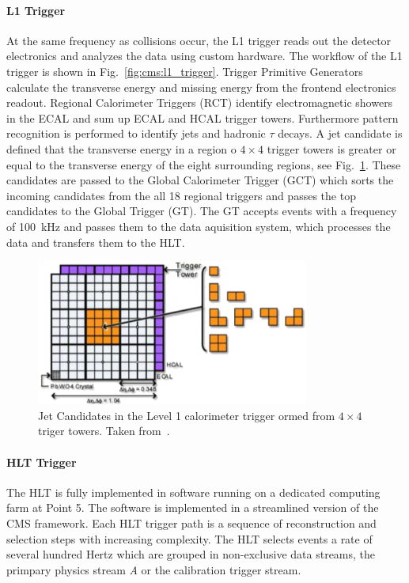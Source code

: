 \paragraph{L1 Trigger} 
At the same frequency as collisions occur, the L1 trigger reads out the detector
electronics and analyzes the data using custom hardware. The workflow of the L1
trigger is shown in Fig.~\ref{fig:cms:l1_trigger}. Trigger Primitive Generators
calculate the transverse energy and missing energy from the frontend electronics
readout. Regional Calorimeter Triggers (RCT) identify electromagnetic showers
in the ECAL and sum up ECAL and HCAL trigger towers. Furthermore pattern
recognition is performed to identify jets and hadronic $\tau$ decays. A jet
candidate is defined that the transverse energy in a region o $4\times4$ trigger
towers is greater or equal to the transverse energy of the eight surrounding
regions, see Fig.~\ref{fig:cms:l1_calo_towers}. These
candidates are passed to the Global Calorimeter Trigger (GCT) which sorts the
incoming candidates from the all 18 regional triggers and passes the top
candidates to the Global Trigger (GT). The GT accepts events with a frequency
of \SI{100}{\kilo\hertz} and passes them to the data aquisition system, which
processes the data and transfers them to the HLT.

\begin{figure}[htp]
    \centering
    \includegraphics[width=0.8\textwidth]{figures/cms_detector/l1_calo_towers.pdf}\hfill
    \caption[Jet Candidates in the Level 1 calorimeter trigger]{Jet Candidates
        in the Level 1 calorimeter trigger ormed from $4\times4$ triger towers. Taken from~\cite{Rose:2009zz}.}
    \label{fig:cms:l1_calo_towers}
\end{figure}


\paragraph{HLT Trigger} The HLT is fully implemented in software running on a
dedicated computing farm at Point 5. The software is implemented in a
streamlined version of the CMS framework. Each HLT trigger path is a sequence of
reconstruction and selection steps with increasing complexity. The HLT selects
events a rate of several hundred Hertz which are grouped in non-exclusive data
streams, \eg the primpary physics stream \emph{A} or the calibration trigger
stream.

